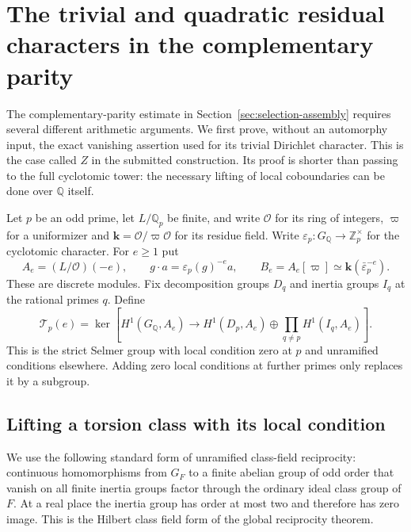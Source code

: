 \section{The trivial and quadratic residual characters in the complementary parity}
\label{sz-selmer-section}

The complementary-parity estimate in
Section~\ref{sec:selection-assembly} requires several different
arithmetic arguments. We first prove, without an automorphy input,
the exact vanishing assertion used for its trivial Dirichlet
character. This is the case called $Z$ in the submitted
construction.\cite{alpo-uniform-source} Its proof is shorter than
passing to the full cyclotomic tower: the necessary lifting of
local coboundaries can be done over $\mathbb Q$ itself.

Let $p$ be an odd prime, let $L/\mathbb Q_p$ be finite, and
write $\mathcal O$ for its ring of integers, $\varpi$ for a
uniformizer and $\mathbf k=\mathcal O/\varpi\mathcal O$ for
its residue field. Write $\varepsilon_p:G_{\mathbb Q}\to
\mathbb Z_p^\times$ for the cyclotomic character. For $e\ge1$
put
\[
 A_e=(L/\mathcal O)(-e),\qquad
       g\cdot a=\varepsilon_p(g)^{-e}a,\qquad
 B_e=A_e[\varpi]\simeq\mathbf k(\bar\varepsilon_p^{-e}).
                                                               \tag{SZ1}
\]
These are discrete modules. Fix decomposition groups $D_q$
and inertia groups $I_q$ at the rational primes $q$. Define
\[
 \mathcal T_p(e)=\ker\left[
 H^1(G_{\mathbb Q},A_e)\longrightarrow
 H^1(D_p,A_e)\oplus\prod_{q\ne p}H^1(I_q,A_e)\right].   \tag{SZ2}
\]
This is the strict Selmer group with local condition zero
at $p$ and unramified conditions elsewhere. Adding zero
local conditions at further primes only replaces it by a
subgroup.

\subsection{Lifting a torsion class with its local condition}

We use the following standard form of unramified class-field
reciprocity: continuous homomorphisms from $G_F$ to a finite
abelian group of odd order that vanish on all finite inertia
groups factor through the ordinary ideal class group of $F$.
At a real place the inertia group has order at most two and
therefore has zero image. This is the Hilbert class field
form of the global reciprocity theorem.\cite[Chapter V,
\S3]{milne-cft}

